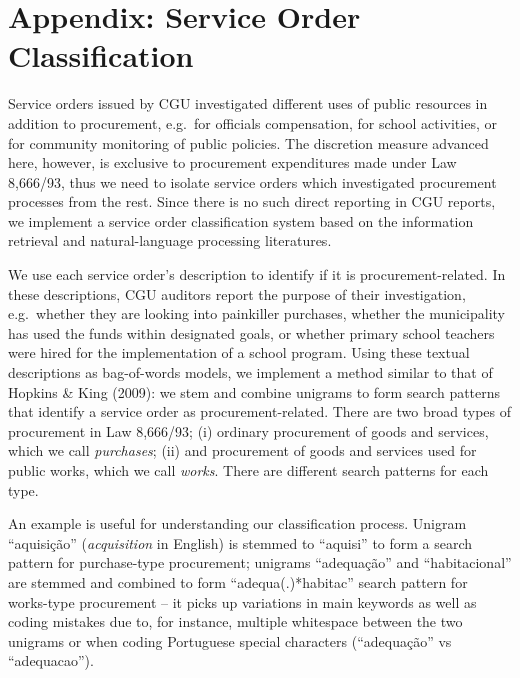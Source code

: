 \documentclass[]{article}
\title{}
\author{}
\date{}
\theoremstyle{definition}
\theoremstyle{definition}
\theoremstyle{definition}
\theoremstyle{remark}
\begin{document}
\hypertarget{appendix-appendix}{%
\appendix}


\hypertarget{appendixA}{%
\section{Appendix: Service Order Classification}\label{appendixA}}

Service orders issued by CGU investigated different uses of public
resources in addition to procurement, e.g.~for officials compensation,
for school activities, or for community monitoring of public policies.
The discretion measure advanced here, however, is exclusive to
procurement expenditures made under Law 8,666/93, thus we need to
isolate service orders which investigated procurement processes from the
rest. Since there is no such direct reporting in CGU reports, we
implement a service order classification system based on the information
retrieval and natural-language processing literatures.

We use each service order's description to identify if it is
procurement-related. In these descriptions, CGU auditors report the
purpose of their investigation, e.g.~whether they are looking into
painkiller purchases, whether the municipality has used the funds within
designated goals, or whether primary school teachers were hired for the
implementation of a school program. Using these textual descriptions as
bag-of-words models, we implement a method similar to that of Hopkins \&
King (2009): we stem and combine unigrams to form search patterns that
identify a service order as procurement-related. There are two broad
types of procurement in Law 8,666/93; (i) ordinary procurement of goods
and services, which we call \emph{purchases}; (ii) and procurement of
goods and services used for public works, which we call \emph{works}.
There are different search patterns for each type.

An example is useful for understanding our classification process.
Unigram ``aquisição'' (\emph{acquisition} in English) is stemmed to
``aquisi'' to form a search pattern for purchase-type procurement;
unigrams ``adequação'' and ``habitacional'' are stemmed and combined to
form ``adequa(.)*habitac'' search pattern for works-type procurement --
it picks up variations in main keywords as well as coding mistakes due
to, for instance, multiple whitespace between the two unigrams or when
coding Portuguese special characters (``adequação'' vs ``adequacao'').
\end{document}
